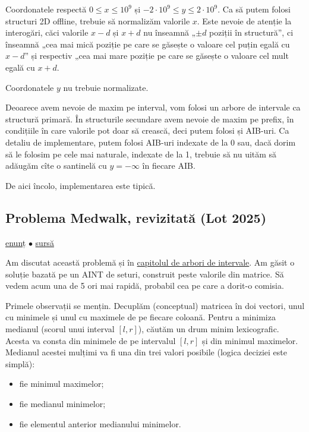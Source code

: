 \documentclass[../main.tex]{subfiles}
\begin{document}
Coordonatele respectă $0 \leq x \leq 10^9$ și $-2 \cdot 10^9 \leq y \leq 2 \cdot 10^9$. Ca să putem folosi structuri 2D offline, trebuie să normalizăm valorile $x$. Este nevoie de atenție la interogări, căci valorile $x - d$ și $x + d$ nu înseamnă „$\pm d$ poziții în structură”, ci înseamnă „cea mai mică poziție pe care se găsește o valoare cel puțin egală cu $x - d$” și respectiv „cea mai mare poziție pe care se găsește o valoare cel mult egală cu $x + d$.

Coordonatele $y$ nu trebuie normalizate.

Deoarece avem nevoie de maxim pe interval, vom folosi un arbore de intervale ca structură primară. În structurile secundare avem nevoie de maxim pe prefix, în condițiile în care valorile pot doar să crească, deci putem folosi și AIB-uri. Ca detaliu de implementare, putem folosi AIB-uri indexate de la 0 sau, dacă dorim să le folosim pe cele mai naturale, indexate de la 1, trebuie să nu uităm să adăugăm cîte o santinelă cu $y = -\infty$ în fiecare AIB.

De aici încolo, implementarea este tipică.

\subsection{Problema Medwalk, revizitată (Lot 2025)}
\label{problem:medwalk-fenwick}

\href{https://kilonova.ro/problems/3790}{enunț}
$\bullet$
\hyperref[code:medwalk-fenwick]{sursă}

Am discutat această problemă și în \hyperref[problem:medwalk]{capitolul de arbori de intervale}. Am găsit o soluție bazată pe un AINT de seturi, construit peste valorile din matrice. Să vedem acum una de 5 ori mai rapidă, probabil cea pe care a dorit-o comisia.

Primele observații se mențin. Decuplăm (conceptual) matricea în doi vectori, unul cu minimele și unul cu maximele de pe fiecare coloană. Pentru a minimiza medianul (scorul unui interval $[l, r]$), căutăm un drum minim lexicografic. Acesta va consta din minimele de pe intervalul $[l, r]$ și din minimul maximelor. Medianul acestei mulțimi va fi una din trei valori posibile (logica deciziei este simplă):

\begin{itemize}
  \item fie minimul maximelor;
  \item fie medianul minimelor;
  \item fie elementul anterior medianului minimelor.
\end{itemize}
\end{document}
